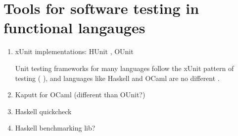 \section{Tools for software testing in functional langauges}
\label{testtools}

\begin{enumerate}
\item xUnit implementations: HUnit \cite{www:hunit}, OUnit \cite{www:ounit}

Unit testing frameworks for many languages follow the xUnit pattern of
testing (\cite{junit} \cite{www:nunit} \cite{www:ruby:unit}), and
languages like Haskell and OCaml are no different \cite{www:hunit}
\cite{www:ounit}.

\item Kaputt for OCaml \cite{www:kaputt} (different than OUnit?)

\item Haskell quickcheck \cite{claessen:quickcheck}
\item Haskell benchmarking lib? \cite{www:criterion}
\end{enumerate}
